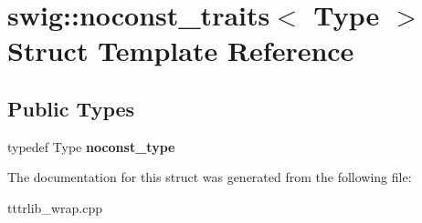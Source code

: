 \hypertarget{structswig_1_1noconst__traits}{}\section{swig\+:\+:noconst\+\_\+traits$<$ Type $>$ Struct Template Reference}
\label{structswig_1_1noconst__traits}
\subsection*{Public Types}
\begin{DoxyCompactItemize}
\item 
\mbox{\label{structswig_1_1noconst__traits_a372428d7bd7dc7ea86f03714159d6354}} 
typedef Type {\bfseries noconst\+\_\+type}
\end{DoxyCompactItemize}


The documentation for this struct was generated from the following file\+:\begin{DoxyCompactItemize}
\item 
tttrlib\+\_\+wrap.\+cpp\end{DoxyCompactItemize}
